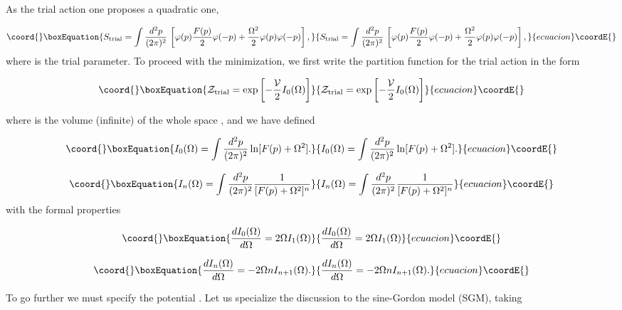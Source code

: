 \documentclass[a4paper,12pt]{article}
\begin{document}
As the trial action one proposes a quadratic one,

\begin{equation}\coord{}\boxEquation{
S\trial=\int\difp\left[\varphi(p)\frac{F(p)}{2}\varphi(-p) +
\frac{\Omega^2}{2}\varphi(p)\varphi(-p)\right],
}{
S\trial=\int\difp\left[\varphi(p)\frac{F(p)}{2}\varphi(-p) +
\frac{\Omega^2}{2}\varphi(p)\varphi(-p)\right],
}{ecuacion}\coordE{}\end{equation}
where \myHighlight{$\Omega$}\coordHE{} is the trial parameter. To proceed with the
minimization, we first write the partition function for the trial
action in the form

\begin{equation}\coord{}\boxEquation{\label{ztrial}
\Z\trial=\exp{\left[-\frac{\V}{2} I_0(\Omega)\right]}
}{\Z\trial=\exp{\left[-\frac{\V}{2} I_0(\Omega)\right]}
}{ecuacion}\coordE{}\end{equation}

\noindent where \myHighlight{$\V$}\coordHE{} is the volume (infinite) of the whole space
\coordHE{}, and we have defined

\begin{equation}\coord{}\boxEquation{
I_0(\Omega)=\int \frac{d^2p}{(2\pi)^2} \ln[F(p)+\Omega^2].
}{
I_0(\Omega)=\int \frac{d^2p}{(2\pi)^2} \ln[F(p)+\Omega^2].
}{ecuacion}\coordE{}\end{equation}

\begin{equation}\coord{}\boxEquation{
I_n(\Omega)=\int \frac{d^2p}{(2\pi)^2} \frac{1}{[F(p)+\Omega^2]^n}
}{
I_n(\Omega)=\int \frac{d^2p}{(2\pi)^2} \frac{1}{[F(p)+\Omega^2]^n}
}{ecuacion}\coordE{}\end{equation}
with the formal properties

\begin{equation}\coord{}\boxEquation{
\frac{dI_0(\Omega)}{d\Omega}=2\Omega I_1(\Omega)
}{
\frac{dI_0(\Omega)}{d\Omega}=2\Omega I_1(\Omega)
}{ecuacion}\coordE{}\end{equation}

\begin{equation}\coord{}\boxEquation{
\frac{dI_n(\Omega)}{d\Omega}=-2\Omega n I_{n+1}(\Omega).
}{
\frac{dI_n(\Omega)}{d\Omega}=-2\Omega n I_{n+1}(\Omega).
}{ecuacion}\coordE{}\end{equation}

To go further we must specify the potential \coordHE{}. Let us specialize the
discussion to the sine-Gordon model (SGM), taking
\end{document}
